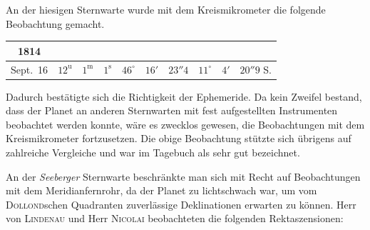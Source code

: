 \par\indent An der hiesigen Sternwarte wurde mit dem Kreismikrometer die folgende Beobachtung gemacht.

\begin{center}\fontsize{9}{11}\selectfont\setlength{\tabcolsep}{3pt}\renewcommand{\arraystretch}{1.15}\begin{tabular}{c|ccc|ccc|ccc}
1814 &  &  &  \\
\hline
Sept.\ 16 & $12^{\mathrm u}$ & $1^{\mathrm m}$ & $1^{\mathrm s}$ & $46^{\circ}$ & $16'$ & $23''4$ & $11^{\circ}$ & $4'$ & $20''9$ S. \\
\end{tabular}\end{center}

\par\indent Dadurch bestätigte sich die Richtigkeit der Ephemeride. Da kein Zweifel bestand, dass der Planet an anderen Sternwarten mit fest aufgestellten Instrumenten beobachtet werden konnte, wäre es zwecklos gewesen, die Beobachtungen mit dem Kreismikrometer fortzusetzen. Die obige Beobachtung stützte sich übrigens auf zahlreiche Vergleiche und war im Tagebuch als sehr gut bezeichnet.

\par\indent An der \emph{Seeberger} Sternwarte beschränkte man sich mit Recht auf Beobachtungen mit dem Meridianfernrohr, da der Planet zu lichtschwach war, um vom \textsc{Dollond}schen Quadranten zuverlässige Deklinationen erwarten zu können. Herr von \textsc{Lindenau} und Herr \textsc{Nicolai} beobachteten die folgenden Rektaszensionen:


